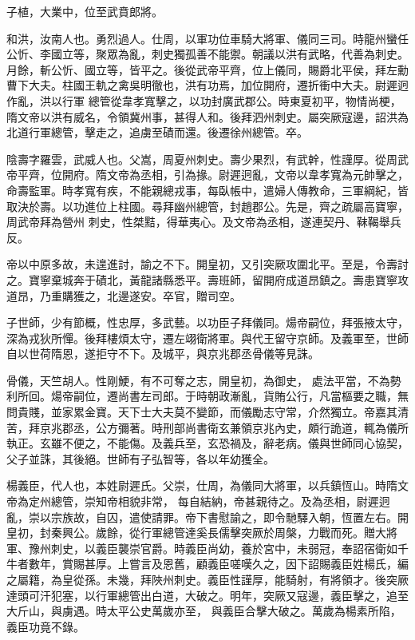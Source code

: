 \begin{pinyinscope}
 子植，大業中，位至武賁郎將。



 和洪，汝南人也。勇烈過人。仕周，以軍功位車騎大將軍、儀同三司。時龍州蠻任公忻、李國立等，聚眾為亂，刺史獨孤善不能禦。朝議以洪有武略，代善為刺史。月餘，斬公忻、國立等，皆平之。後從武帝平齊，位上儀同，賜爵北平侯，拜左勳曹下大夫。柱國王軌之禽吳明徹也，洪有功焉，加位開府，遷折衝中大夫。尉遲迥作亂，洪以行軍
 總管從韋孝寬擊之，以功封廣武郡公。時東夏初平，物情尚梗，隋文帝以洪有威名，令領冀州事，甚得人和。後拜泗州刺史。屬突厥寇邊，詔洪為北道行軍總管，擊走之，追虜至磧而還。後遷徐州總管。卒。



 陰壽字羅雲，武威人也。父嵩，周夏州刺史。壽少果烈，有武幹，性謹厚。從周武帝平齊，位開府。隋文帝為丞相，引為掾。尉遲迥亂，文帝以韋孝寬為元帥擊之，命壽監軍。時孝寬有疾，不能親總戎事，每臥帳中，遣婦人傳教命，三軍綱紀，皆取決於壽。以功進位上柱國。尋拜幽州總管，封趙郡公。先是，齊之疏屬高寶寧，周武帝拜為營州
 刺史，性桀黠，得華夷心。及文帝為丞相，遂連契丹、靺鞨舉兵反。



 帝以中原多故，未遑進討，諭之不下。開皇初，又引突厥攻圍北平。至是，令壽討之。寶寧棄城奔于磧北，黃龍諸縣悉平。壽班師，留開府成道昂鎮之。壽患寶寧攻道昂，乃重購獲之，北邊遂安。卒官，贈司空。



 子世師，少有節概，性忠厚，多武藝。以功臣子拜儀同。煬帝嗣位，拜張掖太守，深為戎狄所憚。後拜樓煩太守，遷左翊衛將軍。與代王留守京師。及義軍至，世師自以世荷隋恩，遂拒守不下。及城平，與京兆郡丞骨儀等見誅。



 骨儀，天竺胡人。性剛鯁，有不可奪之志，開皇初，為御史，
 處法平當，不為勢利所回。煬帝嗣位，遷尚書左司郎。于時朝政漸亂，貨賄公行，凡當樞要之職，無問貴賤，並家累金寶。天下士大夫莫不變節，而儀勵志守常，介然獨立。帝嘉其清苦，拜京兆郡丞，公方彌著。時刑部尚書衛玄兼領京兆內史，頗行詭道，輒為儀所執正。玄雖不便之，不能傷。及義兵至，玄恐禍及，辭老病。儀與世師同心協契，父子並誅，其後絕。世師有子弘智等，各以年幼獲全。



 楊義臣，代人也，本姓尉遲氏。父崇，仕周，為儀同大將軍，以兵鎮恆山。時隋文帝為定州總管，崇知帝相貌非常，
 每自結納，帝甚親待之。及為丞相，尉遲迥亂，崇以宗族故，自囚，遣使請罪。帝下書慰諭之，即令馳驛入朝，恆置左右。開皇初，封秦興公。歲餘，從行軍總管達奚長儒擊突厥於周槃，力戰而死。贈大將軍、豫州刺史，以義臣襲崇官爵。時義臣尚幼，養於宮中，未弱冠，奉詔宿衛如千牛者數年，賞賜甚厚。上嘗言及恩舊，顧義臣嗟嘆久之，因下詔賜義臣姓楊氏，編之屬籍，為皇從孫。未幾，拜陜州刺史。義臣性謹厚，能騎射，有將領才。後突厥達頭可汗犯塞，以行軍總管出白道，大破之。明年，突厥又寇邊，義臣擊之，追至大斤山，與虜遇。時太平公史萬歲亦至，
 與義臣合擊大破之。萬歲為楊素所陷，義臣功竟不錄。




\end{pinyinscope}
